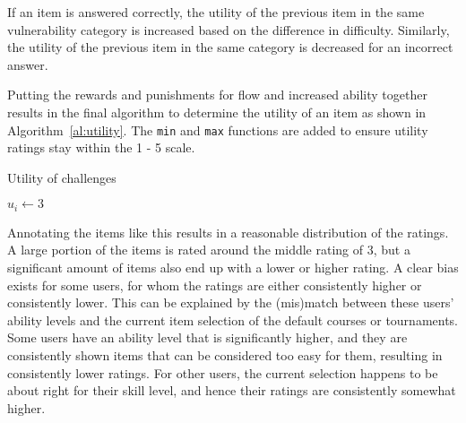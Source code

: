 If an item is answered correctly, the utility of the previous item in the same vulnerability category is increased based on the difference in difficulty.
Similarly, the utility of the previous item in the same category is decreased for an incorrect answer.

Putting the rewards and punishments for flow and increased ability together results in the final algorithm to determine the utility of an item as shown in Algorithm~\ref{al:utility}.
The \texttt{min} and \texttt{max} functions are added to ensure utility ratings stay within the 1 - 5 scale.

\begin{algorithm}[H]
\caption{\label{al:utility}Utility of challenges}
\SetAlgoLined
{}
$u_i \leftarrow 3$\\
    {
    }
\Else
    {
    }
\end{algorithm}

Annotating the items like this results in a reasonable distribution of the ratings.
A large portion of the items is rated around the middle rating of 3, but a significant amount of items also end up with a lower or higher rating.
A clear bias exists for some users, for whom the ratings are either consistently higher or consistently lower.
This can be explained by the (mis)match between these users' ability levels and the current item selection of the default courses or tournaments.
Some users have an ability level that is significantly higher, and they are consistently shown items that can be considered too easy for them, resulting in consistently lower ratings.
For other users, the current selection happens to be about right for their skill level, and hence their ratings are consistently somewhat higher.